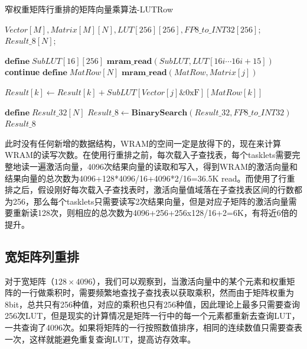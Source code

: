 \begin{algorithm}[!ht]
    \caption{窄权重矩阵行重排的矩阵向量乘算法-LUTRow}
    \label{LUT_Row}
    \begin{algorithmic}[1]
        \Require $Vector[M], Matrix[M][N], LUT[256][256], FP8\_to\_INT32[256]$; %
        \Ensure $Result\_8[N]$; %

            \State $\textbf{define}\; SubLUT[16][256]$
            \State $\textbf{mram\_read}(SubLUT, LUT[16i \cdots 16i + 15])$
            \Comment{\textcolor{blue}{parallel in 16 for each tasklet}}
                    \State \textbf{continue}
                \EndIf
                \State $\textbf{define}\; MatRow[N]$
                \State $\textbf{mram\_read}(MatRow, Matrix[j])$
                \Comment{\textcolor{blue}{parallel in N for each tasklet}}
                
                \Comment{\textcolor{blue}{parallel in N for each tasklet}}
                    \State $Result[k] \gets Result[k] + SubLUT[Vector[j] \& \text{0xF}][MatRow[k]]$
                \EndFor
            \EndFor
        \EndFor

        \State $\textbf{define}\; Result\_32[N]$
        \State $Result\_8 \gets \textbf{BinarySearch}(Result\_32, FP8\_to\_INT32)$
        \Comment{\textcolor{blue}{parallel in N for each tasklet}}
        \State \Return $Result\_8$
    \end{algorithmic}
\end{algorithm}

此时没有任何新增的数据结构，WRAM的空间一定是放得下的，现在来计算WRAM的读写次数。在使用行重排之前，每次载入子查找表，每个tasklets需要完整地读一遍激活向量，4096次结果向量的读取和写入，得到WRAM的激活向量和结果向量的总次数为4096+128*4096/16+4096*2/16=36.5K read。而使用了行重排之后，假设刚好每次载入子查找表时，激活向量值域落在子查找表区间的行数都为256，那么每个tasklets只需要读写2次结果向量，但是对应子矩阵的激活向量需要重新读128次，则相应的总次数为4096+256+256x128/16+2=6K，有将近6倍的提升。

\subsection{宽矩阵列重排}
对于宽矩阵（$128\times 4096$），我们可以观察到，当激活向量中的某个元素和权重矩阵的一行做乘积时，需要频繁地查找子查找表以获取乘积，然而由于矩阵权重为8bit，总共只有256种值，对应的乘积也只有256种值，因此理论上最多只需要查询256次LUT，但是现实的计算情况是矩阵一行中的每一个元素都重新去查询LUT，一共查询了4096次。如果将矩阵的一行按照数值排序，相同的连续数值只需要查表一次，这样就能避免重复查询LUT，提高访存效率。

